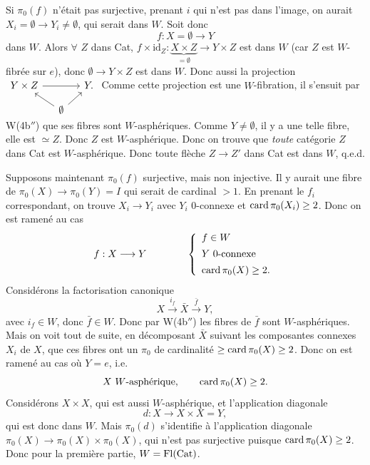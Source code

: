 Si $\pi_0(f)$ n'était pas surjective, prenant $i$ qui n'est pas dans l'image, on aurait $X_i = \emptyset \longrightarrow Y_i \neq \emptyset$, qui serait dans $W$. Soit donc
\[
f : X = \emptyset \longrightarrow Y
\]
dans $W$. Alors $\forall$ $Z$ dans Cat, $f \times \mathrm{id}_Z : \underbrace{X \times Z}_{= \emptyset} \longrightarrow Y \times Z$ est dans $W$ (car $Z$ est
$W$-fibrée sur $e$), donc $\emptyset \longrightarrow Y \times Z$ est dans $W$. Donc aussi la projection
$\begin{tikzcd}[column sep=small, row sep=small, baseline=(\tikzcdmatrixname-1-1.base)]
Y \times Z \arrow[rr] & & Y. \\
& \emptyset \arrow[ul] \arrow[ur] &
\end{tikzcd}$
Comme cette projection est une $W$-fibration, il s'ensuit par W(4b$''$) que ses fibres sont $W$-asphériques. Comme $Y \neq \emptyset$, il y a une telle fibre, elle est $\simeq Z$. Donc $Z$ est $W$-asphérique. Donc on trouve que \textit{toute} catégorie $Z$ dans Cat est $W$-asphérique. Donc toute flèche $Z \longrightarrow Z'$ dans Cat est dans $W$, q.e.d.

Supposons maintenant $\pi_0(f)$ surjective, mais non injective. Il y aurait une fibre de $\pi_0(X) \longrightarrow \pi_0(Y) = I$ qui serait de cardinal $> 1$. En prenant le $f_i$ correspondant, on trouve $X_i \longrightarrow Y_i$ avec $Y_i$ 0-connexe et $\operatorname{card} \pi_0(X_i) \geq 2$. Donc on est ramené au cas
\[
f : X \longrightarrow Y \qquad\qquad \left\{
\begin{array}{l}
f \in W \\[1ex]
Y \text{ 0-connexe} \\[1ex]
\operatorname{card} \pi_0(X) \geq 2.
\end{array}
\right.
\]
Considérons la factorisation canonique
\[
X \xrightarrow{i_f} \bar{X} \xrightarrow{\bar{f}} Y,
\]
avec $i_f \in W$, donc $\bar{f} \in W$. Donc par W(4b$''$) les fibres de $\bar{f}$ sont $W$-asphériques. Mais on voit tout de suite, en décomposant $\bar{X}$ suivant les composantes connexes $X_i$ de $X$, que ces fibres ont un $\pi_0$ de cardinalité $\geq \operatorname{card} \pi_0(X) \geq 2$. Donc on est ramené au cas où $Y = e$, i.e.
\[
X \ W\text{-asphérique}, \qquad \operatorname{card} \pi_0(X) \geq 2.
\]
Considérons $X \times X$, qui est aussi $W$-asphérique, et l'application diagonale
\[
d : X \longrightarrow X \times X = Y,
\]
qui est donc dans $W$. Mais $\pi_0(d)$ s'identifie à l'application diagonale $\pi_0(X) \longrightarrow \pi_0(X) \times \pi_0(X)$, qui n'est pas surjective puisque $\operatorname{card} \pi_0(X) \geq 2$. Donc pour la première partie, $W = \mathrm{Fl}(\mathrm{Cat})$.

